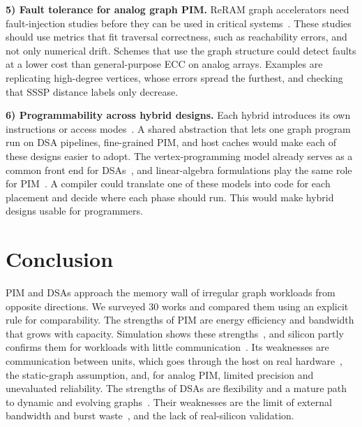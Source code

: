 \documentclass[journal,onecolumn]{IEEEtran}
\begin{document}
\textbf{5) Fault tolerance for analog graph PIM.} ReRAM graph accelerators need fault-injection studies before they can be used in critical systems~\cite{song2018graphr,zheng2020spara}. These studies should use metrics that fit traversal correctness, such as reachability errors, and not only numerical drift. Schemes that use the graph structure could detect faults at a lower cost than general-purpose ECC on analog arrays. Examples are replicating high-degree vertices, whose errors spread the furthest, and checking that SSSP distance labels only decrease.

\textbf{6) Programmability across hybrid designs.} Each hybrid introduces its own instructions or access modes~\cite{shin2025piccolo,shin2025fala,yenimol2026cograf}. A shared abstraction that lets one graph program run on DSA pipelines, fine-grained PIM, and host caches would make each of these designs easier to adopt. The vertex-programming model already serves as a common front end for DSAs~\cite{ham2016graphicionado}, and linear-algebra formulations play the same role for PIM~\cite{barkhordar2025alphapim}. A compiler could translate one of these models into code for each placement and decide where each phase should run. This would make hybrid designs usable for programmers.

\section{Conclusion}
PIM and DSAs approach the memory wall of irregular graph workloads from opposite directions. We surveyed 30 works and compared them using an explicit rule for comparability. The strengths of PIM are energy efficiency and bandwidth that grows with capacity. Simulation shows these strengths~\cite{ahn2015tesseract,zhuo2019graphq}, and silicon partly confirms them for workloads with little communication~\cite{gomezluna2022prim,cai2024pimpam}. Its weaknesses are communication between units, which goes through the host on real hardware~\cite{gomezluna2022prim,barkhordar2025alphapim}, the static-graph assumption, and, for analog PIM, limited precision and unevaluated reliability. The strengths of DSAs are flexibility and a mature path to dynamic and evolving graphs~\cite{rahman2021jetstream,zhao2022tdgraph,gao2023mega}. Their weaknesses are the limit of external bandwidth and burst waste~\cite{shin2025piccolo,chen2022regraph}, and the lack of real-silicon validation.
\end{document}
